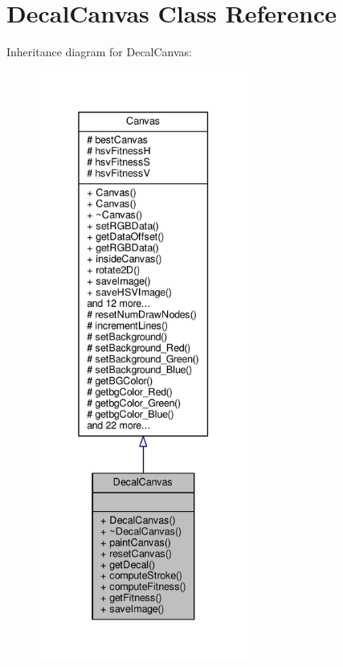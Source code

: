 \hypertarget{classDecalCanvas}{}\section{Decal\+Canvas Class Reference}
\label{classDecalCanvas}


Inheritance diagram for Decal\+Canvas\+:
\nopagebreak
\begin{figure}[H]
\begin{center}
\leavevmode
\includegraphics[height=550pt]{classDecalCanvas__inherit__graph}
\end{center}
\end{figure}


